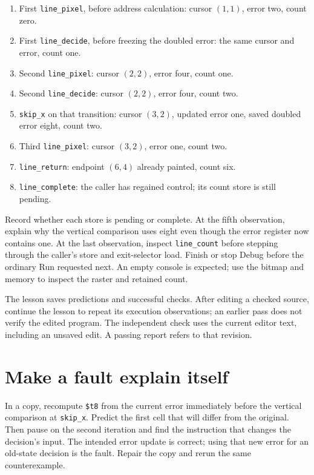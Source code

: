 \begin{enumerate}
  \item First \texttt{line\_pixel}, before address calculation: cursor $(1,1)$,
        error two, count zero.
  \item First \texttt{line\_decide}, before freezing the doubled error: the same
        cursor and error, count one.
  \item Second \texttt{line\_pixel}: cursor $(2,2)$, error four, count one.
  \item Second \texttt{line\_decide}: cursor $(2,2)$, error four, count two.
  \item \texttt{skip\_x} on that transition: cursor $(3,2)$, updated error one,
        saved doubled error eight, count two.
  \item Third \texttt{line\_pixel}: cursor $(3,2)$, error one, count two.
  \item \texttt{line\_return}: endpoint $(6,4)$ already painted, count six.
  \item \texttt{line\_complete}: the caller has regained control; its count store
        is still pending.
\end{enumerate}

Record whether each store is pending or complete. At the fifth observation,
explain why the vertical comparison uses eight even though the error register
now contains one. At the last observation, inspect \texttt{line\_count} before
stepping through the caller's store and exit-selector load. Finish or stop Debug
before the ordinary Run requested next. An empty console is expected; use the
bitmap and memory to inspect the raster and retained count.

The lesson saves predictions and successful checks. After editing a checked
source, continue the lesson to repeat its execution observations; an earlier
pass does not verify the edited program. The independent check uses the current
editor text, including an unsaved edit. A passing report refers to that revision.

\section{Make a fault explain itself}

In a copy, recompute \texttt{\$t8} from the current error immediately before the
vertical comparison at \texttt{skip\_x}. Predict the first cell that will differ
from the original. Then pause on the second iteration and find the instruction
that changes the decision's input. The intended error update is correct; using
that new error for an old-state decision is the fault. Repair the copy and rerun
the same counterexample.

